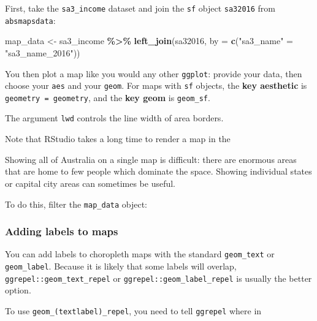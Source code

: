 \documentclass[
]{book}
\newenvironment{Shaded}{\begin{snugshade}}{\end{snugshade}}
\newcommand{\DataTypeTok}[1]{\textcolor[rgb]{0.13,0.29,0.53}{#1}}
\newcommand{\KeywordTok}[1]{\textcolor[rgb]{0.13,0.29,0.53}{\textbf{#1}}}
\newcommand{\NormalTok}[1]{#1}
\newcommand{\OperatorTok}[1]{\textcolor[rgb]{0.81,0.36,0.00}{\textbf{#1}}}
\newcommand{\StringTok}[1]{\textcolor[rgb]{0.31,0.60,0.02}{#1}}
\begin{document}
First, take the \texttt{sa3\_income} dataset and join the \texttt{sf} object \texttt{sa32016} from \texttt{absmapsdata}:

\begin{Shaded}
\begin{Highlighting}[]
\NormalTok{map\_data \textless{}{-}}\StringTok{ }\NormalTok{sa3\_income }\OperatorTok{\%\textgreater{}\%}\StringTok{ }
\StringTok{  }\KeywordTok{left\_join}\NormalTok{(sa32016, }\DataTypeTok{by =} \KeywordTok{c}\NormalTok{(}\StringTok{"sa3\_name"}\NormalTok{ =}\StringTok{ "sa3\_name\_2016"}\NormalTok{))}
\end{Highlighting}
\end{Shaded}

You then plot a map like you would any other \texttt{ggplot}: provide your data, then choose your \texttt{aes} and your \texttt{geom}. For maps with \texttt{sf} objects, the \textbf{key aesthetic} is \texttt{geometry\ =\ geometry}, and the \textbf{key geom} is \texttt{geom\_sf}.

The argument \texttt{lwd} controls the line width of area borders.

Note that RStudio takes a long time to render a map in the

Showing all of Australia on a single map is difficult: there are enormous areas that are home to few people which dominate the space. Showing individual states or capital city areas can sometimes be useful.

To do this, filter the \texttt{map\_data} object:

\hypertarget{adding-labels-to-maps}{%
\subsubsection{Adding labels to maps}\label{adding-labels-to-maps}}

You can add labels to choropleth maps with the standard \texttt{geom\_text} or \texttt{geom\_label}. Because it is likely that some labels will overlap, \texttt{ggrepel::geom\_text\_repel} or \texttt{ggrepel::geom\_label\_repel} is usually the better option.

To use \texttt{geom\_(text\textbar{}label)\_repel}, you need to tell \texttt{ggrepel} where in
\end{document}
